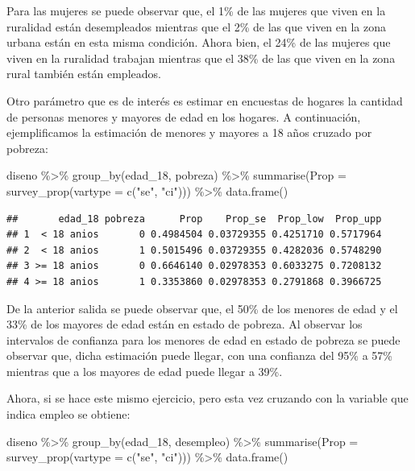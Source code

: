 \documentclass[
  12pt,
]{book}
\newenvironment{Shaded}{\begin{snugshade}}{\end{snugshade}}
\newcommand{\AttributeTok}[1]{\textcolor[rgb]{0.77,0.63,0.00}{#1}}
\newcommand{\FunctionTok}[1]{\textcolor[rgb]{0.00,0.00,0.00}{#1}}
\newcommand{\NormalTok}[1]{#1}
\newcommand{\SpecialCharTok}[1]{\textcolor[rgb]{0.00,0.00,0.00}{#1}}
\newcommand{\StringTok}[1]{\textcolor[rgb]{0.31,0.60,0.02}{#1}}
\begin{document}
Para las mujeres se puede observar que, el 1\% de las mujeres que viven en la ruralidad están desempleados mientras que el 2\% de las que viven en la zona urbana están en esta misma condición. Ahora bien, el 24\% de las mujeres que viven en la ruralidad trabajan mientras que el 38\% de las que viven en la zona rural también están empleados.

Otro parámetro que es de interés es estimar en encuestas de hogares la cantidad de personas menores y mayores de edad en los hogares. A continuación, ejemplificamos la estimación de menores y mayores a 18 años cruzado por pobreza:

\begin{Shaded}
\begin{Highlighting}[]
\NormalTok{diseno }\SpecialCharTok{\%\textgreater{}\%} \FunctionTok{group\_by}\NormalTok{(edad\_18, pobreza) }\SpecialCharTok{\%\textgreater{}\%} 
           \FunctionTok{summarise}\NormalTok{(}\AttributeTok{Prop =} \FunctionTok{survey\_prop}\NormalTok{(}\AttributeTok{vartype =}  \FunctionTok{c}\NormalTok{(}\StringTok{"se"}\NormalTok{, }\StringTok{"ci"}\NormalTok{))) }\SpecialCharTok{\%\textgreater{}\%}
           \FunctionTok{data.frame}\NormalTok{()}
\end{Highlighting}
\end{Shaded}

\begin{verbatim}
##       edad_18 pobreza      Prop    Prop_se  Prop_low  Prop_upp
## 1  < 18 anios       0 0.4984504 0.03729355 0.4251710 0.5717964
## 2  < 18 anios       1 0.5015496 0.03729355 0.4282036 0.5748290
## 3 >= 18 anios       0 0.6646140 0.02978353 0.6033275 0.7208132
## 4 >= 18 anios       1 0.3353860 0.02978353 0.2791868 0.3966725
\end{verbatim}

De la anterior salida se puede observar que, el 50\% de los menores de edad y el 33\% de los mayores de edad están en estado de pobreza. Al observar los intervalos de confianza para los menores de edad en estado de pobreza se puede observar que, dicha estimación puede llegar, con una confianza del 95\% a 57\% mientras que a los mayores de edad puede llegar a 39\%.

Ahora, si se hace este mismo ejercicio, pero esta vez cruzando con la variable que indica empleo se obtiene:

\begin{Shaded}
\begin{Highlighting}[]
\NormalTok{diseno }\SpecialCharTok{\%\textgreater{}\%} \FunctionTok{group\_by}\NormalTok{(edad\_18, desempleo) }\SpecialCharTok{\%\textgreater{}\%} 
           \FunctionTok{summarise}\NormalTok{(}\AttributeTok{Prop =} \FunctionTok{survey\_prop}\NormalTok{(}\AttributeTok{vartype =}  \FunctionTok{c}\NormalTok{(}\StringTok{"se"}\NormalTok{, }\StringTok{"ci"}\NormalTok{))) }\SpecialCharTok{\%\textgreater{}\%}
           \FunctionTok{data.frame}\NormalTok{()}
\end{Highlighting}
\end{Shaded}
\end{document}
